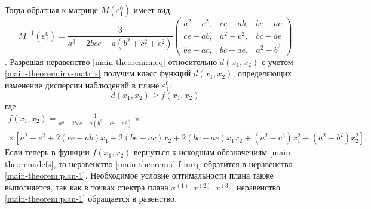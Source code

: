 Тогда обратная к матрице $M(\varepsilon_1^0)$ имеет вид:
\begin{equation} \label{main-theorem:inv-matrix}
M^{-1}(\varepsilon_1^0) = \frac 3 {a^3 + 2 b c e - a(b^2 + c^2 + e^2)}
\begin{pmatrix}
a^2 - e^2,& ce - ab, & be - ac\\
ce - ab,& a^2-c^2,& bc-ae\\
be - ac,& bc - ae,& a^2 - b^2			
\end{pmatrix} 
\end{equation}.
Разрешая неравенство \eqref{main-theorem:ineq} относительно $d(x_1, x_2)$ с учетом \eqref{main-theorem:inv-matrix} получим класс функций $d(x_1, x_2)$, определяющих изменение
дисперсии наблюдений в плане $\varepsilon_1^0$:
\begin{equation} \label{main-theorem:d-f-ineq}
d(x_1, x_2) \ge f(x_1, x_2)
\end{equation}
где
\begin{multline}
f(x_1, x_2) =
\frac {1}{a^3 + 2bce - a(b^2+c^2+e^2)} \times \\
\times [{a^2 - e^2 +2(ce - ab)x_1 + 2(be-ac)x_2 + 2(bc - ae)x_1 x_2 + (a^2 - c^2)x_1^2 + (a^2 - b^2)x_2^2}].		
\end{multline}
Если теперь в функции $f(x_1, x_2)$ вернуться к исходным обозначениям \eqref{main-theorem:defs}, то неравенство \eqref{main-theorem:d-f-ineq} обратится в неравенство \eqref{main-theorem:plan-1}. Необходимое условие оптимальности плана также выполняется, так как в точках спектра плана $x^{(1)}, x^{(2)}, x^{(3)}$  неравенство \eqref{main-theorem:plan-1} обращается в равенство.

